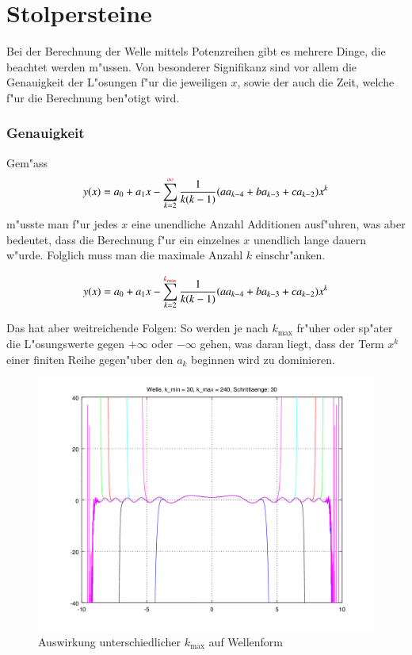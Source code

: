 \section{Stolpersteine}

Bei der Berechnung der Welle mittels Potenzreihen gibt es mehrere Dinge, die 
beachtet werden m"ussen. Von besonderer Signifikanz sind vor allem die 
Genauigkeit der L"osungen f"ur die jeweiligen $x$, sowie der auch die Zeit, 
welche f"ur die Berechnung ben"otigt wird.


\subsubsection{Genauigkeit}
Gem"ass
\begin{equation*}
	y(x) = a_0 + a_1x 
	-\sum_{k=2}^{\textcolor{red}{\infty}}\frac{1}{k(k-1)}(aa_{k-4}+ba_{k-3}+ca_{k-2})x^k
\end{equation*}
m"usste man f"ur jedes $x$ eine unendliche Anzahl Additionen ausf"uhren, was 
aber bedeutet, dass die Berechnung f"ur ein einzelnes $x$ unendlich lange 
dauern w"urde. Folglich muss man die maximale Anzahl $k$ einschr"anken.

\begin{equation*}
	y(x) = a_0 + a_1x 
	-\sum_{k=2}^{\textcolor{red}{k_{\text{max}}}}\frac{1}{k(k-1)}(aa_{k-4}+ba_{k-3}+ca_{k-2})x^k
\end{equation*}

Das hat aber weitreichende Folgen: So werden je nach $k_{\text{max}}$ fr"uher 
oder sp"ater die L"osungswerte gegen $+\infty$ oder $-\infty$ gehen, was daran 
liegt, dass der Term $x^k$ einer finiten Reihe gegen"uber den $a_k$ beginnen 
wird zu dominieren.

\begin{figure}
	\includegraphics[scale=0.65]{./wellen/images/kmax/krangewaveeven.png}
	\caption{Auswirkung unterschiedlicher $k_{\text{max}}$ auf Wellenform}
	\label{fig:wellen:variablekmax}
\end{figure}

